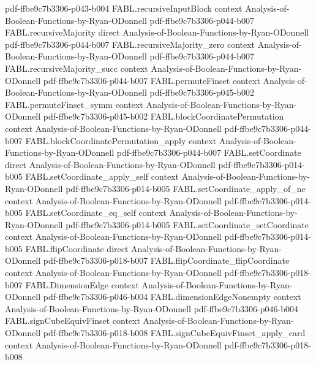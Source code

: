 \begin{theorem}
  {pdf-ffbe9c7b3306-p043-b004}
\proofstep
  {FABL.recursiveInputBlock}
  {context}
  {Analysis-of-Boolean-Functions-by-Ryan-ODonnell}
  {pdf-ffbe9c7b3306-p044-b007}
\proofstep
  {FABL.recursiveMajority}
  {direct}
  {Analysis-of-Boolean-Functions-by-Ryan-ODonnell}
  {pdf-ffbe9c7b3306-p044-b007}
\proofstep
  {FABL.recursiveMajority_zero}
  {context}
  {Analysis-of-Boolean-Functions-by-Ryan-ODonnell}
  {pdf-ffbe9c7b3306-p044-b007}
\proofstep
  {FABL.recursiveMajority_succ}
  {context}
  {Analysis-of-Boolean-Functions-by-Ryan-ODonnell}
  {pdf-ffbe9c7b3306-p044-b007}
\proofstep
  {FABL.permuteFinset}
  {context}
  {Analysis-of-Boolean-Functions-by-Ryan-ODonnell}
  {pdf-ffbe9c7b3306-p045-b002}
\proofstep
  {FABL.permuteFinset_symm}
  {context}
  {Analysis-of-Boolean-Functions-by-Ryan-ODonnell}
  {pdf-ffbe9c7b3306-p045-b002}
\proofstep
  {FABL.blockCoordinatePermutation}
  {context}
  {Analysis-of-Boolean-Functions-by-Ryan-ODonnell}
  {pdf-ffbe9c7b3306-p044-b007}
\proofstep
  {FABL.blockCoordinatePermutation_apply}
  {context}
  {Analysis-of-Boolean-Functions-by-Ryan-ODonnell}
  {pdf-ffbe9c7b3306-p044-b007}
\proofstep
  {FABL.setCoordinate}
  {direct}
  {Analysis-of-Boolean-Functions-by-Ryan-ODonnell}
  {pdf-ffbe9c7b3306-p014-b005}
\proofstep
  {FABL.setCoordinate_apply_self}
  {context}
  {Analysis-of-Boolean-Functions-by-Ryan-ODonnell}
  {pdf-ffbe9c7b3306-p014-b005}
\proofstep
  {FABL.setCoordinate_apply_of_ne}
  {context}
  {Analysis-of-Boolean-Functions-by-Ryan-ODonnell}
  {pdf-ffbe9c7b3306-p014-b005}
\proofstep
  {FABL.setCoordinate_eq_self}
  {context}
  {Analysis-of-Boolean-Functions-by-Ryan-ODonnell}
  {pdf-ffbe9c7b3306-p014-b005}
\proofstep
  {FABL.setCoordinate_setCoordinate}
  {context}
  {Analysis-of-Boolean-Functions-by-Ryan-ODonnell}
  {pdf-ffbe9c7b3306-p014-b005}
\proofstep
  {FABL.flipCoordinate}
  {direct}
  {Analysis-of-Boolean-Functions-by-Ryan-ODonnell}
  {pdf-ffbe9c7b3306-p018-b007}
\proofstep
  {FABL.flipCoordinate_flipCoordinate}
  {context}
  {Analysis-of-Boolean-Functions-by-Ryan-ODonnell}
  {pdf-ffbe9c7b3306-p018-b007}
\proofstep
  {FABL.DimensionEdge}
  {context}
  {Analysis-of-Boolean-Functions-by-Ryan-ODonnell}
  {pdf-ffbe9c7b3306-p046-b004}
\proofstep
  {FABL.dimensionEdgeNonempty}
  {context}
  {Analysis-of-Boolean-Functions-by-Ryan-ODonnell}
  {pdf-ffbe9c7b3306-p046-b004}
\proofstep
  {FABL.signCubeEquivFinset}
  {context}
  {Analysis-of-Boolean-Functions-by-Ryan-ODonnell}
  {pdf-ffbe9c7b3306-p018-b008}
\proofstep
  {FABL.signCubeEquivFinset_apply_card}
  {context}
  {Analysis-of-Boolean-Functions-by-Ryan-ODonnell}
  {pdf-ffbe9c7b3306-p018-b008}

\end{theorem}
